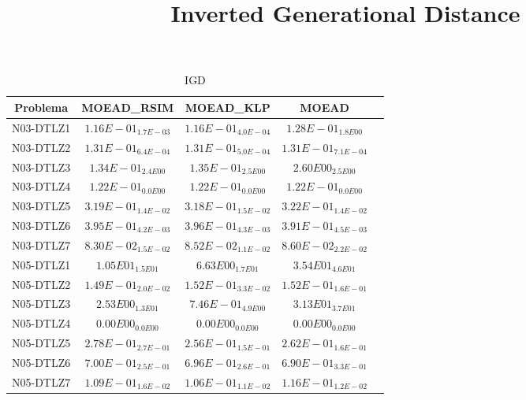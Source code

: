 \documentclass{article}
\title{Inverted Generational Distance}
\author{}
\begin{document}
\maketitle
\begin{table*}[ht!]
\scriptsize
\caption{IGD}
\centering\begin{tabular}{|c||c||c||c||c|} \hline
Problema &MOEAD_RSIM &MOEAD_KLP &MOEAD\\\hline
N03-DTLZ1 &\cellcolor{gray25}$1.16E-01_{1.7E-03}$ &\cellcolor{gray95}$1.16E-01_{4.0E-04}$ &$1.28E-01_{1.8E00}$\\ 
\hline
N03-DTLZ2 &\cellcolor{gray25}$1.31E-01_{6.4E-04}$ &\cellcolor{gray95}$1.31E-01_{5.0E-04}$ &$1.31E-01_{7.1E-04}$\\ 
\hline
N03-DTLZ3 &\cellcolor{gray95}$1.34E-01_{2.4E00}$ &\cellcolor{gray25}$1.35E-01_{2.5E00}$ &$2.60E00_{2.5E00}$\\ 
\hline
N03-DTLZ4 &\cellcolor{gray95}$1.22E-01_{0.0E00}$ &\cellcolor{gray25}$1.22E-01_{0.0E00}$ &$1.22E-01_{0.0E00}$\\ 
\hline
N03-DTLZ5 &\cellcolor{gray25}$3.19E-01_{1.4E-02}$ &\cellcolor{gray95}$3.18E-01_{1.5E-02}$ &$3.22E-01_{1.4E-02}$\\ 
\hline
N03-DTLZ6 &\cellcolor{gray25}$3.95E-01_{4.2E-03}$ &$3.96E-01_{4.3E-03}$ &\cellcolor{gray95}$3.91E-01_{4.5E-03}$\\ 
\hline
N03-DTLZ7 &\cellcolor{gray95}$8.30E-02_{1.5E-02}$ &\cellcolor{gray25}$8.52E-02_{1.1E-02}$ &$8.60E-02_{2.2E-02}$\\ 
\hline
N05-DTLZ1 &\cellcolor{gray25}$1.05E01_{1.5E01}$ &\cellcolor{gray95}$6.63E00_{1.7E01}$ &$3.54E01_{4.6E01}$\\ 
\hline
N05-DTLZ2 &\cellcolor{gray95}$1.49E-01_{2.0E-02}$ &\cellcolor{gray25}$1.52E-01_{3.3E-02}$ &$1.52E-01_{1.6E-01}$\\ 
\hline
N05-DTLZ3 &\cellcolor{gray25}$2.53E00_{1.3E01}$ &\cellcolor{gray95}$7.46E-01_{4.9E00}$ &$3.13E01_{3.7E01}$\\ 
\hline
N05-DTLZ4 &\cellcolor{gray95}$0.00E00_{0.0E00}$ &\cellcolor{gray25}$0.00E00_{0.0E00}$ &$0.00E00_{0.0E00}$\\ 
\hline
N05-DTLZ5 &$2.78E-01_{2.7E-01}$ &\cellcolor{gray95}$2.56E-01_{1.5E-01}$ &\cellcolor{gray25}$2.62E-01_{1.6E-01}$\\ 
\hline
N05-DTLZ6 &$7.00E-01_{2.5E-01}$ &\cellcolor{gray25}$6.96E-01_{2.6E-01}$ &\cellcolor{gray95}$6.90E-01_{3.3E-01}$\\ 
\hline
N05-DTLZ7 &\cellcolor{gray25}$1.09E-01_{1.6E-02}$ &\cellcolor{gray95}$1.06E-01_{1.1E-02}$ &$1.16E-01_{1.2E-02}$\\ 

\end{tabular}
\end{table*}
\end{document}

